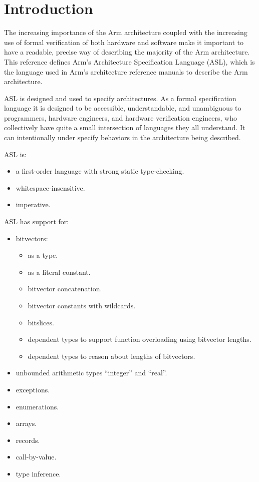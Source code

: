\chapter{Introduction\label{chap:Introduction}}

The increasing importance of the Arm architecture coupled with the increasing use of formal verification of both
hardware and software make it important to have a readable, precise way of describing the majority of the Arm
architecture. This reference defines Arm’s Architecture Specification Language (ASL), which is the language
used in Arm’s architecture reference manuals to describe the Arm architecture.

ASL is designed and used to specify architectures. As a formal
specification language it is designed to be accessible, understandable, and unambiguous to programmers, hardware
engineers, and hardware verification engineers, who collectively have quite a small intersection of languages they
all understand. It can intentionally under specify behaviors in the architecture being described.

ASL is:
\begin{itemize}
    \item a first-order language with strong static type-checking.
    \item whitespace-insensitive.
    \item imperative.
\end{itemize}

ASL has support for:
\begin{itemize}
    \item bitvectors:
    \begin{itemize}
        \item as a type.
        \item as a literal constant.
        \item bitvector concatenation.
        \item bitvector constants with wildcards.
        \item bitslices.
        \item dependent types to support function overloading using bitvector lengths.
        \item dependent types to reason about lengths of bitvectors.
    \end{itemize}
    \item unbounded arithmetic types “integer” and “real”.
    \item exceptions.
    \item enumerations.
    \item arrays.
    \item records.
    \item call-by-value.
    \item type inference.
\end{itemize}

